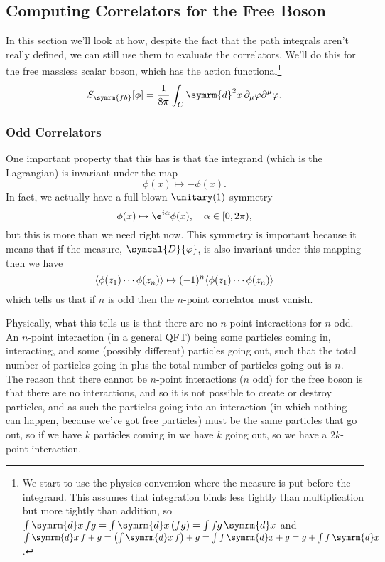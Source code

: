 \documentclass[fleqn]{NotesClass}
\renewcommand{\dd}[1]{\,\symrm{d}#1}
\renewcommand{\dl}[1]{\symrm{d}#1}
\newcommand{\DL}{\symcal{D}}
\DeclarePairedDelimiter{\correlator}{\langle}{\rangle}
\newcommand{\freeboson}{\symrm{fb}}
\begin{document}
    \subsection{Computing Correlators for the Free Boson}
    In this section we'll look at how, despite the fact that the path integrals aren't really defined, we can still use them to evaluate the correlators.
    We'll do this for the free massless scalar boson, which has the action functional\footnote{We start to use the physics convention where the measure is put before the integrand. This assumes that integration binds less tightly than multiplication but more tightly than addition, so \(\int \dl{x} \, fg = \int \dl{x} \, (fg) = \int fg \dd{x}\) and \(\int \dl{x} \, f + g = \left( \int \dl{x} \, f \right) + g = \int f \dd{x} + g = g + \int f \dd{x}\).}
    \begin{equation}
        S_{\freeboson}[\phi] = \frac{1}{8\pi} \int_C \dl{^2x} \, \partial_\mu \varphi \partial^\mu \varphi.
    \end{equation}
    
    \subsubsection{Odd Correlators}
    One important property that this has is that the integrand (which is the Lagrangian) is invariant under the map
    \begin{equation}
        \phi(x) \mapsto -\phi(x).
    \end{equation}
    In fact, we actually have a full-blown \(\unitary(1)\) symmetry
    \begin{equation}
        \phi(x) \mapsto \e^{i\alpha}\phi(x), \quad \alpha \in [0, 2\pi),
    \end{equation}
    but this is more than we need right now.
    This symmetry is important because it means that if the measure, \(\DL{\varphi}\), is also invariant under this mapping then we have
    \begin{equation}
        \correlator{\phi(z_1) \dotsm \phi(z_n)} \mapsto (-1)^n \correlator{\phi(z_1) \dotsm \phi(z_n)}
    \end{equation}
    which tells us that if \(n\) is odd then the \(n\)-point correlator must vanish.
    
    Physically, what this tells us is that there are no \(n\)-point interactions for \(n\) odd.
    An \(n\)-point interaction (in a general QFT) being some particles coming in, interacting, and some (possibly different) particles going out, such that the total number of particles going in plus the total number of particles going out is \(n\).
    The reason that there cannot be \(n\)-point interactions (\(n\) odd) for the free boson is that there are no interactions, and so it is not possible to create or destroy particles, and as such the particles going into an interaction (in which nothing can happen, because we've got free particles) must be the same particles that go out, so if we have \(k\) particles coming in we have \(k\) going out, so we have a \(2k\)-point interaction.
    
\end{document}
